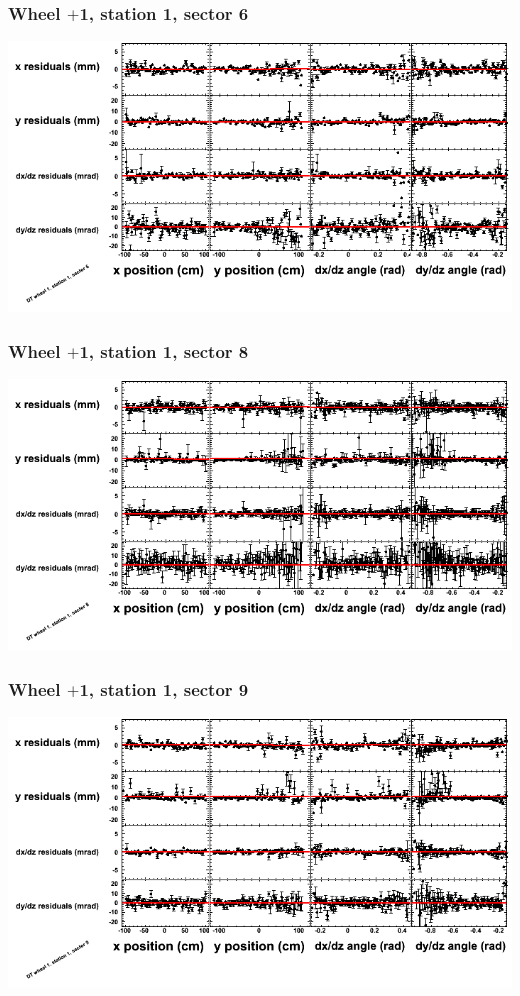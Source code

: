\documentclass[compress]{beamer}
\begin{document}
\begin{frame}
\frametitle{Wheel $+$1, station 1, sector 6}
\includegraphics[width=\linewidth]{tmppoly_MBwhDst1sec06.png}
\end{frame}

\begin{frame}
\frametitle{Wheel $+$1, station 1, sector 8}
\includegraphics[width=\linewidth]{tmppoly_MBwhDst1sec08.png}
\end{frame}

\begin{frame}
\frametitle{Wheel $+$1, station 1, sector 9}
\includegraphics[width=\linewidth]{tmppoly_MBwhDst1sec09.png}
\end{frame}
\end{document}
